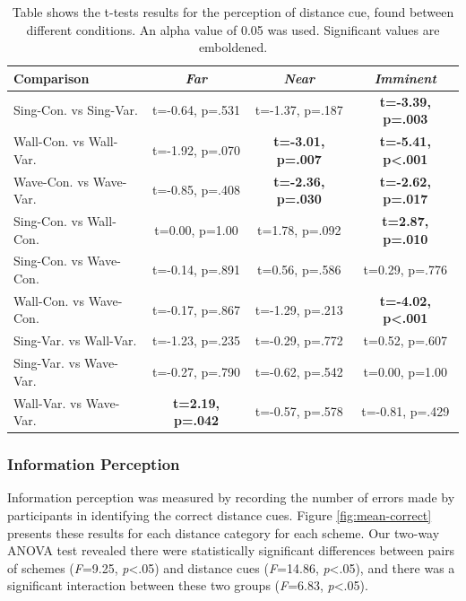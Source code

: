 \documentclass{mpaper}
\begin{document}
\begin{table}[h]
    \centering
    \begin{tabular}{l|c|c|c}
        \toprule
        Comparison & \emph{Far} & \emph{Near} & \emph{Imminent} \\ \midrule
        Sing-Con. vs Sing-Var. & t=-0.64, p=.531 & t=-1.37, p=.187 & \textbf{t=-3.39, p=.003} \\
        Wall-Con. vs Wall-Var. & t=-1.92, p=.070 & \textbf{t=-3.01, p=.007} & \textbf{t=-5.41, p<.001} \\
        Wave-Con. vs Wave-Var. & t=-0.85, p=.408 & \textbf{t=-2.36, p=.030} & \textbf{t=-2.62, p=.017} \\ \midrule
        Sing-Con. vs Wall-Con. & t=0.00, p=1.00 & t=1.78, p=.092 & \textbf{t=2.87, p=.010} \\
        Sing-Con. vs Wave-Con. & t=-0.14, p=.891 & t=0.56, p=.586 & t=0.29, p=.776 \\
        Wall-Con. vs Wave-Con. & t=-0.17, p=.867 & t=-1.29, p=.213 & \textbf{t=-4.02, p<.001} \\ \midrule
        Sing-Var. vs Wall-Var. & t=-1.23, p=.235 & t=-0.29, p=.772 & t=0.52, p=.607 \\
        Sing-Var. vs Wave-Var. & t=-0.27, p=.790 & t=-0.62, p=.542 & t=0.00, p=1.00 \\
        Wall-Var. vs Wave-Var. & \textbf{t=2.19, p=.042} & t=-0.57, p=.578 & t=-0.81, p=.429 \\
        \bottomrule
    \end{tabular}
    \caption{Table shows the t-tests results for the perception of distance cue, found between different conditions. An alpha value of 0.05 was used. Significant values are emboldened.}
    \label{tab:cue-perception-stats}
\end{table}



\subsubsection{Information Perception}
Information perception was measured by recording the number of errors made by participants in identifying the correct distance cues. Figure \ref{fig:mean-correct} presents these results for each distance category for each scheme. Our two-way ANOVA test revealed there were statistically significant differences between pairs of schemes (\textit{F}=9.25, \textit{p}<.05) and distance cues (\textit{F}=14.86, \textit{p}<.05), and there was a significant interaction between these two groups (\textit{F}=6.83, \textit{p}<.05).
\end{document}
